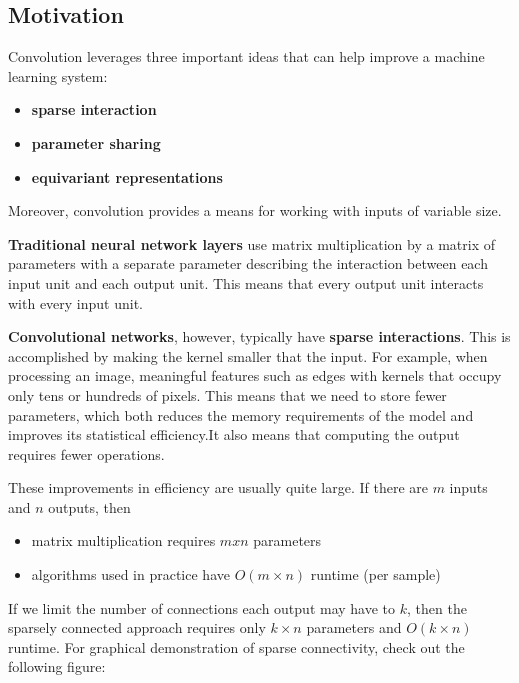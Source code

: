 \documentclass{report}
\begin{document}
\subsection{Motivation}
Convolution leverages three important ideas that can help improve a machine learning system:
\begin{itemize}
	\item \textbf{sparse interaction}
    \item \textbf{parameter sharing}
    \item \textbf{equivariant representations}
\end{itemize}
Moreover, convolution provides a means for working with inputs of variable size.

\noindent \textbf{Traditional neural network layers} use matrix multiplication by a matrix of parameters with a separate parameter describing the interaction between each input unit and each output unit. This means that every output unit interacts with every input unit.

\noindent \textbf{Convolutional networks}, however, typically have \textbf{sparse interactions}. This is accomplished by making the kernel smaller that the input. For example, when processing an image, meaningful features such as edges with kernels that occupy only tens or hundreds of pixels. This means that we need to store fewer parameters, which both reduces the memory requirements of the model and improves its statistical efficiency.It also means that computing the output requires fewer operations.

\noindent These improvements in efficiency are usually quite large. If there are $m$ inputs and
$n$ outputs, then 
\begin{itemize}
	\item matrix multiplication requires $mxn$ parameters
    \item algorithms used in practice have $O(m \times n)$ runtime (per sample)
\end{itemize}
If we limit the number of connections each output may have to $k$, then the sparsely connected approach requires only $k \times n$ parameters and $O(k \times n)$ runtime. For graphical demonstration of sparse connectivity, check out the following figure:
\end{document}
